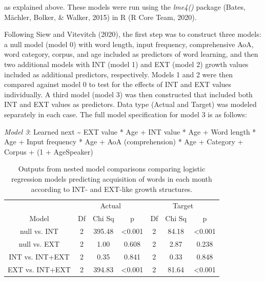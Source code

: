 \documentclass[
  man]{apa6}
\begin{document}
as explained above. These models were run using the \emph{lme4()} package (Bates, Mächler, Bolker, \& Walker, 2015) in R (R Core Team, 2020).

Following Siew and Vitevitch (2020), the first step was to construct three models: a null model (model 0) with word length, input frequency, comprehensive AoA, word category, corpus, and age included as predictors of word learning, and then two additional models with INT (model 1) and EXT (model 2) growth values included as additional predictors, respectively. Models 1 and 2 were then compared against model 0 to test for the effects of INT and EXT values individually. A third model (model 3) was then constructed that included both INT and EXT values as predictors. Data type (Actual and Target) was modeled separately in each case. The full model specification for model 3 is as follows:

\emph{Model 3}: Learned next \textasciitilde{}
EXT value * Age +
INT value * Age +
Word length * Age +
Input frequency * Age +
AoA (comprehension) * Age +
Category +
Corpus +
(1 + Age\textbar Speaker)

\begin{longtable}[t]{ccccccc}
\caption{\label{tab:table-model-outputs}Outputs from nested model comparisons comparing logistic regression models predicting acquisition of words in each month according to INT- and EXT-like growth structures.}\\
\toprule
\multicolumn{1}{c}{ } & \multicolumn{3}{c}{Actual} & \multicolumn{3}{c}{Target} \\
\cmidrule(l{3pt}r{3pt}){2-4} \cmidrule(l{3pt}r{3pt}){5-7}
Model & Df & Chi Sq & p & Df & Chi Sq & p\\
\midrule
null vs. INT & 2 & 395.48 & <0.001 & 2 & 84.18 & <0.001\\
null vs. EXT & 2 & 1.00 & 0.608 & 2 & 2.87 & 0.238\\
INT vs. INT+EXT & 2 & 0.35 & 0.841 & 2 & 0.33 & 0.848\\
EXT vs. INT+EXT & 2 & 394.83 & <0.001 & 2 & 81.64 & <0.001\\
\midrule
\bottomrule
\end{longtable}
\end{document}
